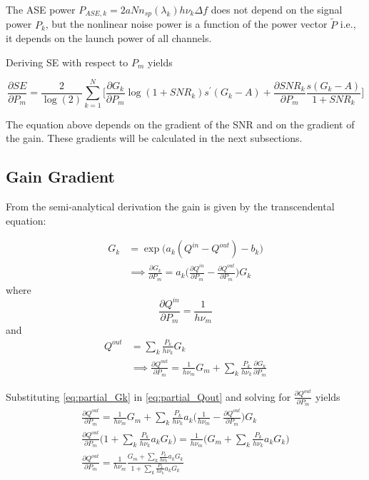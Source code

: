 \documentclass[a4paper]{article}
\begin{document}
The ASE power $P_{ASE, k} = 2aNn_{sp}(\lambda_k)h\nu_k\Delta f$ does not depend on the signal power $P_k$, but the nonlinear noise power is a function of the power vector $\tilde{P}$ i.e., it depends on the launch power of all channels.

Deriving SE with respect to $P_m$ yields

\begin{equation} \label{eq:partial_SE}
	\frac{\partial SE}{\partial P_m} = \frac{2}{\log(2)}\sum_{k = 1}^N \bigg [
	\frac{\partial G_k}{\partial P_m} \log(1 + SNR_k) s^{\prime}(G_k - A) + \frac{\partial SNR_k}{\partial P_m}\frac{ s(G_k - A)}{1 + SNR_k}
	\bigg]
\end{equation}

The equation above depends on the gradient of the SNR and on the gradient of the gain. These gradients will be calculated in the next subsections.

\subsection{Gain Gradient}

From the semi-analytical derivation the gain is given by the transcendental equation:

\begin{align} 
G_k &= \exp\Big(a_k(Q^{in} - Q^{out}) - b_k\Big) \\ \label{eq:partial_Gk}
& \implies \frac{\partial G_k}{\partial P_m} = a_k\Big(\frac{\partial Q^{in}}{\partial P_m} - \frac{\partial Q^{out}}{\partial P_m}\Big)G_k
\end{align}
where
\begin{equation}
\frac{\partial Q^{in}}{\partial P_m} = \frac{1}{h\nu_m}
\end{equation}
and 
\begin{align}
Q^{out} &= \sum_k\frac{P_k}{h\nu_k}G_k \\ \label{eq:partial_Qout}
& \implies \frac{\partial Q^{out}}{\partial P_m} = \frac{1}{h\nu_m}G_m + \sum_k  \frac{P_k}{h\nu_k}\frac{\partial G_k}{\partial P_m}
\end{align}

Substituting \eqref{eq:partial_Gk} in \eqref{eq:partial_Qout} and solving for $\frac{\partial Q^{out}}{\partial P_m}$ yields
\begin{align} \nonumber
\frac{\partial Q^{out}}{\partial P_m} = \frac{1}{h\nu_m}G_m + \sum_k  \frac{P_k}{h\nu_k}a_k\Big(\frac{1}{h\nu_m} - \frac{\partial Q^{out}}{\partial P_m}\Big)G_k \\ \nonumber
\frac{\partial Q^{out}}{\partial P_m}\bigg(1 + \sum_k\frac{P_k}{h\nu_k}a_kG_k \bigg) = \frac{1}{h\nu_m}\bigg(G_m + \sum_k\frac{P_k}{h\nu_k}a_kG_k\bigg) \\
\frac{\partial Q^{out}}{\partial P_m} = \frac{1}{h\nu_m}\frac{G_m + \sum_k\frac{P_k}{h\nu_k}a_kG_k}{1 + \sum_k\frac{P_k}{h\nu_k}a_kG_k}
\end{align}
\end{document}

